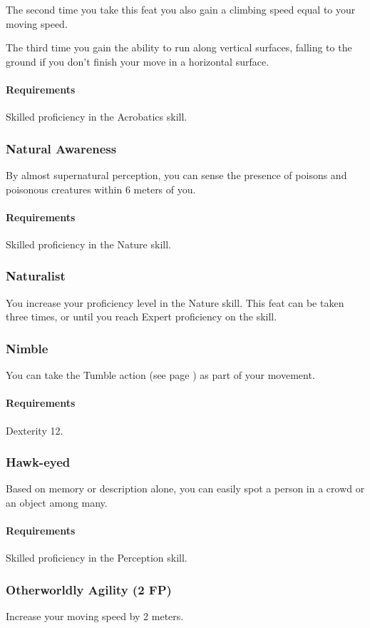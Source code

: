     The second time you take this feat you also gain a climbing speed equal to your moving speed.

    The third time you gain the ability to run along vertical surfaces, falling to the ground if you don't finish your move in a horizontal surface.
    \paragraph{Requirements} Skilled proficiency in the Acrobatics skill.
\subsubsection{Natural Awareness} \label{feat::naturalawareness}
    By almost supernatural perception, you can sense the presence of poisons and poisonous creatures within 6 meters of you.

    \paragraph{Requirements} Skilled proficiency in the Nature skill.
\subsubsection{Naturalist} \label{feat::naturalist}
    You increase your proficiency level in the Nature skill.
    This feat can be taken three times, or until you reach Expert proficiency on the skill.
\subsubsection{Nimble} \label{feat::nimble}
    You can take the Tumble action (see page \pageref{act::tumble}) as part of your movement.
    \paragraph{Requirements} Dexterity 12.
\subsubsection{Hawk-eyed} \label{feat::hawkeyed}
    Based on memory or description alone, you can easily spot a person in a crowd or an object among many.
    \paragraph{Requirements} Skilled proficiency in the Perception skill.
\subsubsection{Otherworldly Agility (2 FP)} \label{feat::otherwordlyagility}
    Increase your moving speed by 2 meters.

